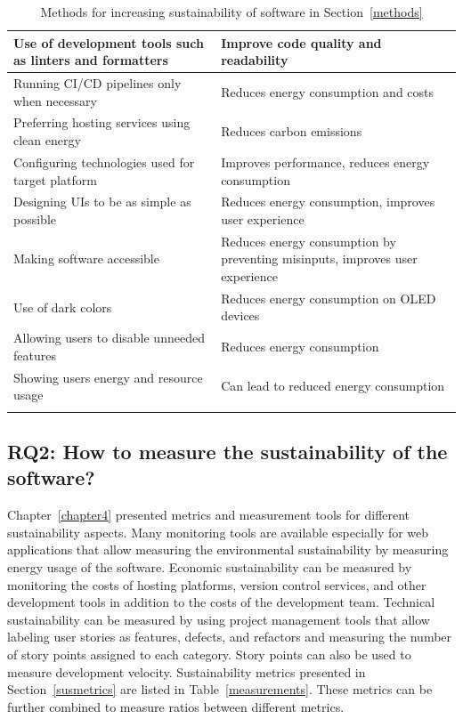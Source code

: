 \begin{longtable}{ |p{}|p{}| }
\hline
Use of development tools such as linters and formatters & Improve code quality and readability\\
\hline
Running CI/CD pipelines only when necessary & Reduces energy consumption and costs\\
\hline
Preferring hosting services using clean energy & Reduces carbon emissions\\
\hline
Configuring technologies used for target platform & Improves performance, reduces energy consumption\\
\hline
Designing UIs to be as simple as possible & Reduces energy consumption, improves user experience\\
\hline
Making software accessible & Reduces energy consumption by preventing misinputs, improves user experience\\
\hline
Use of dark colors & Reduces energy consumption on OLED devices\\
\hline
Allowing users to disable unneeded features & Reduces energy consumption\\
\hline
Showing users energy and resource usage & Can lead to reduced energy consumption\\
\hline
\caption{Methods for increasing sustainability of software in Section~\ref{methods}}
\label{susmethods}
\end{longtable}

\subsection{RQ2: How to measure the sustainability of the software?}
Chapter~\ref{chapter4} presented metrics and measurement tools for different sustainability aspects. Many monitoring tools are available especially for web applications that allow measuring the environmental sustainability by measuring energy usage of the software. Economic sustainability can be measured by monitoring the costs of hosting platforms, version control services, and other development tools in addition to the costs of the development team. Technical sustainability can be measured by using project management tools that allow labeling user stories as features, defects, and refactors and measuring the number of story points assigned to each category. Story points can also be used to measure development velocity. Sustainability metrics presented in Section~\ref{susmetrics} are listed in Table~\ref{measurements}. These metrics can be further combined to measure ratios between different metrics.

